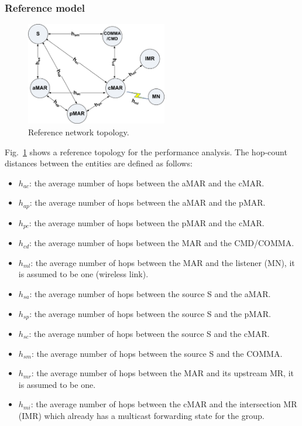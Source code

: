 \subsubsection{Reference model}
\begin{figure}[tb!] 
  \begin{center} 
    \includegraphics[width=0.55\textwidth]{./Part3/Chapter8/figures/c10_topology_analysis.eps} 
    \caption{Reference network topology.}
    \label{fig:c10_topology_analysis}
  \end{center} 
\end{figure}

Fig.~\ref{fig:c10_topology_analysis} shows a reference topology for the performance analysis. The hop-count distances between the entities are defined as follows:
\setlength \abovedisplayskip{-1pt}
\vspace{-0.1in}
\begin{itemize}
\itemsep 0.07em
\item $h_{ac}$: the average number of hops between the aMAR and the cMAR.
\item $h_{ap}$: the average number of hops between the aMAR and the pMAR.
\item $h_{pc}$: the average number of hops between the pMAR and the cMAR.
\item $h_{cd}$: the average number of hops between the MAR and the CMD/COMMA.
\item $h_{ml}$: the average number of hops between the MAR and the listener (MN), it is assumed to be one (wireless link).
\item $h_{sa}$: the average number of hops between the source S and the aMAR.
\item $h_{sp}$: the average number of hops between the source S and the pMAR.
\item $h_{sc}$: the average number of hops between the source S and the cMAR.
\item $h_{sm}$: the average number of hops between the source S and the COMMA.
\item $h_{mr}$: the average number of hops between the MAR and its upstream MR, it is assumed to be one. 
\item $h_{mi}$: the average number of hops between the cMAR and the intersection MR (IMR) which already has a multicast forwarding state for the group.
\end{itemize}

